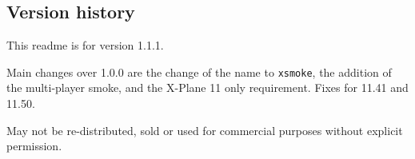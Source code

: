 \documentclass[a4paper,12pt]{article}
\begin{document}
\vspace{0.2cm}
\subsection*{\large{\textbf{Version history}}}
\vspace{0.2cm}

This readme is for version 1.1.1. 

Main changes over 1.0.0 are the change of the name to \texttt{xsmoke},
the addition of the multi-player smoke, and the X-Plane 11 only
requirement. Fixes for 11.41 and 11.50.

\vspace{0.5\baselineskip} {\color{text1}
 May not be re-distributed, sold or used for commercial purposes without explicit permission.}
\end{document}
